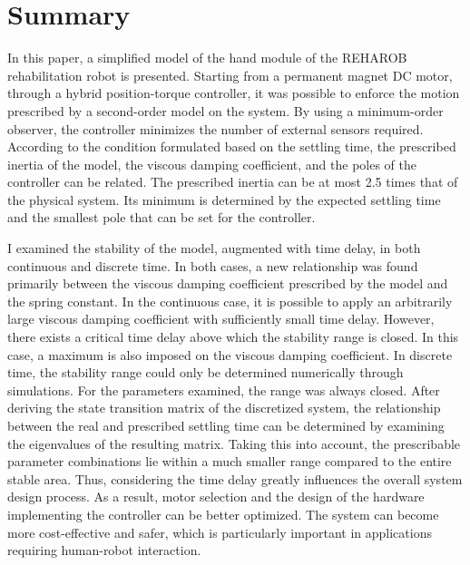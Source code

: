 \chapter*{Summary}\label{chap:summary_eng}

\begin{otherlanguage}{USenglish}
In this paper, a simplified model of the hand module of the REHAROB rehabilitation robot is presented. 
Starting from a permanent magnet DC motor, through a hybrid position-torque controller, it was possible to 
enforce the motion prescribed by a second-order model on the system. By using a minimum-order observer, 
the controller minimizes the number of external sensors required. According to the condition formulated based on the settling time, 
the prescribed inertia of the model, the viscous damping coefficient, and the poles of the controller can be related. 
The prescribed inertia can be at most 2.5 times that of the physical system. Its minimum is determined by the expected 
settling time and the smallest pole that can be set for the controller.

I examined the stability of the model, augmented with time delay, in both continuous and discrete time. 
In both cases, a new relationship was found primarily between the viscous damping coefficient prescribed by 
the model and the spring constant. In the continuous case, it is possible to apply an arbitrarily large 
viscous damping coefficient with sufficiently small time delay. However, there exists a critical time delay 
above which the stability range is closed. In this case, a maximum is also imposed on the viscous damping coefficient. 
In discrete time, the stability range could only be determined numerically through simulations. For the parameters examined, 
the range was always closed. After deriving the state transition matrix of the discretized system, 
the relationship between the real and prescribed settling time can be determined by examining the eigenvalues of the resulting matrix. 
Taking this into account, the prescribable parameter combinations lie within a much smaller range compared to the entire stable area. 
Thus, considering the time delay greatly influences the overall system design process. As a result, motor selection and the design of 
the hardware implementing the controller can be better optimized. The system can become more cost-effective and safer, which is particularly 
important in applications requiring human-robot interaction.

\end{otherlanguage}
